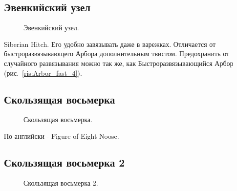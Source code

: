 \subsection{Эвенкийский узел}

\begin{figure}[H]\centering
	\subfloat[Завязывание]{\label{ris:Siberian_Hitch_1}
	\tcbox[enhanced jigsaw,colframe=black,opacityframe=0.5,opacityback=0.5]
		{\centering
			}
		}
\end{figure}
\begin{figure}[H]\centering
	\subfloat[Результат]{\label{ris:Siberian_Hitch_2}
	\tcbox[enhanced jigsaw,colframe=black,opacityframe=0.5,opacityback=0.5]
		{\centering
			}
		}
	\caption{Эвенкийский узел.}\label{ris:Siberian_Hitch}
\end{figure}

Siberian Hitch. Его удобно завязывать даже в варежках. Отличается от быстроразвязывающего Арбора дополнительным твистом. Предохранить от случайного развязывания можно так же, как Быстроразвязывающийся Арбор (рис.~\ref{ris:Arbor_fast_4}).

\subsection{Скользящая восьмерка}

\begin{figure}[H]\centering
	\begin{minipage}{1\linewidth}
		\begin{center}
			\tcbox[enhanced jigsaw,colframe=black,opacityframe=0.5,opacityback=0.5]
			{\centering{}}
		\end{center}
	\end{minipage}
\caption{Скользящая восьмерка.}
\label{ris:Sliding_figure_of_eight}
\end{figure}

По английски - Figure-of-Eight Noose.

\subsection{Скользящая восьмерка 2}

\begin{figure}[H]\centering
	\begin{minipage}{1\linewidth}
		\begin{center}
			\tcbox[enhanced jigsaw,colframe=black,opacityframe=0.5,opacityback=0.5]
			{\centering{}}
		\end{center}
	\end{minipage}
\caption{Скользящая восьмерка 2.}
\label{ris:Sliding_figure_of_eight_2}
\end{figure}

